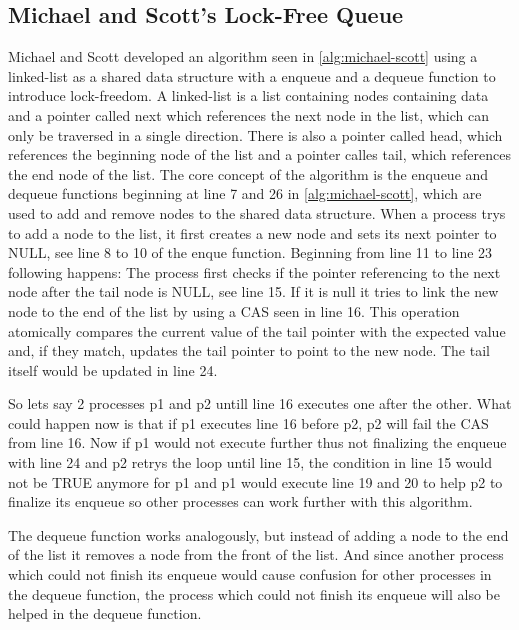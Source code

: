 \subsection{Michael and Scott's Lock-Free Queue}\label{subsec:michael-scott}

Michael and Scott developed an algorithm seen in \cref{alg:michael-scott} using a linked-list as a shared data structure with a enqueue and a dequeue function to introduce lock-freedom. A linked-list is a list containing nodes containing data and a pointer called next which references the next node in the list, which can only be traversed in a single direction. There is also a pointer called head, which references the beginning node of the list and a pointer calles tail, which references the end node of the list. The core concept of the algorithm is the enqueue and dequeue functions beginning at line 7 and 26 in \cref{alg:michael-scott}, which are used to add and remove nodes to the shared data structure. When a process trys to add a node to the list, it first creates a new node and sets its next pointer to NULL, see line 8 to 10 of the enque function. Beginning from line 11 to line 23 following happens: The process first checks if the pointer referencing to the next node after the tail node is NULL, see line 15. If it is null it tries to link the new node to the end of the list by using a \ac{CAS} seen in line 16. This operation atomically compares the current value of the tail pointer with the expected value and, if they match, updates the tail pointer to point to the new node. The tail itself would be updated in line 24.  \cite{MichaelScottQueue}

So lets say 2 processes p1 and p2 untill line 16 executes one after the other. What could happen now is that if p1 executes line 16 before p2, p2 will fail the \ac{CAS} from line 16. Now if p1 would not execute further thus not finalizing the enqueue with line 24 and p2 retrys the loop until line 15, the condition in line 15 would not be TRUE anymore for p1 and p1 would execute line 19 and 20 to help p2 to finalize its enqueue so other processes can work further with this algorithm. \cite{MichaelScottQueue}

The dequeue function works analogously, but instead of adding a node to the end of the list it removes a node from the front of the list. And since another process which could not finish its enqueue would cause confusion for other processes in the dequeue function, the process which could not finish its enqueue will also be helped in the dequeue function. \cite{MichaelScottQueue}

